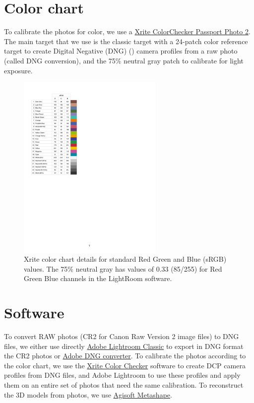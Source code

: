 \documentclass[
]{book}
\theoremstyle{definition}
\theoremstyle{definition}
\theoremstyle{definition}
\theoremstyle{definition}
\theoremstyle{remark}
\begin{document}
\hypertarget{color-chart}{%
\section{Color chart}\label{color-chart}}

To calibrate the photos for color, we use a \href{https://www.xrite.com/categories/calibration-profiling/colorchecker-classic-family/colorchecker-passport-photo-2}{Xrite ColorChecker Passport
Photo
2}.
The main target that we use is the classic target with a 24-patch color
reference target to create Digital Negative (DNG) (\citet{Adobe2012DNG}) camera
profiles from a raw photo (called DNG conversion), and the 75\% neutral
gray patch to calibrate for light exposure.

\begin{figure}
\hypertarget{fig:xrite_description}{%
\centering
\includegraphics[width=7cm,height=\textheight]{Figures/Color chart sRGB values.pdf}
\caption{Xrite color chart details for standard Red Green and Blue (sRGB)
values. The 75\% neutral gray has values of 0.33 (85/255) for Red Green
Blue channels in the LightRoom
software.}\label{fig:xrite_description}
}
\end{figure}

\hypertarget{software}{%
\section{Software}\label{software}}

To convert RAW photos (CR2 for Canon Raw Version 2 image files) to DNG
files, we either use directly \href{https://www.adobe.com/ca_fr/products/photoshop-lightroom-classic.html}{Adobe Lightroom
Classic}
to export in DNG format the CR2 photos or \href{https://helpx.adobe.com/camera-raw/using/adobe-dng-converter.html}{Adobe DNG
converter}.
To calibrate the photos according to the color chart, we use the \href{https://xritephoto.com/ph_product_overview.aspx?ID=938\&Action=Support\&SoftwareID=2030}{Xrite
Color
Checker}
software to create DCP camera profiles from DNG files, and Adobe
Lightroom to use these profiles and apply them on an entire set of
photos that need the same calibration. To reconstruct the 3D models from
photos, we use \href{https://www.agisoft.com/downloads/installer/}{Agisoft
Metashape}.
\end{document}
